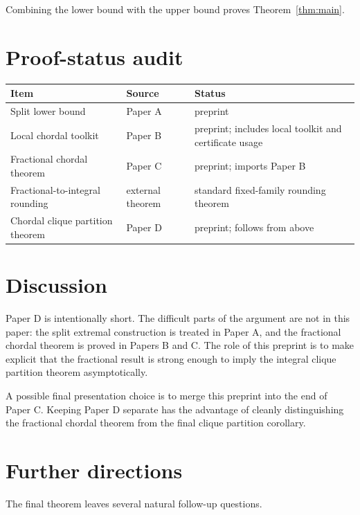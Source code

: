\documentclass[11pt]{article}
\theoremstyle{definition}
\begin{document}
Combining the lower bound with the upper bound proves Theorem~\ref{thm:main}.

\section{Proof-status audit}

\begin{center}
\begin{tabular}{lll}
\toprule
Item & Source & Status\\
\midrule
Split lower bound & Paper A & preprint\\
Local chordal toolkit & Paper B & preprint; includes local toolkit and certificate usage\\
Fractional chordal theorem & Paper C & preprint; imports Paper B\\
Fractional-to-integral rounding & external theorem & standard fixed-family rounding theorem\\
Chordal clique partition theorem & Paper D & preprint; follows from above\\
\bottomrule
\end{tabular}
\end{center}

\section{Discussion}

Paper D is intentionally short. The difficult parts of the argument are not in this paper: the split extremal construction is treated in Paper A, and the fractional chordal theorem is proved in Papers B and C. The role of this preprint is to make explicit that the fractional result is strong enough to imply the integral clique partition theorem asymptotically.

A possible final presentation choice is to merge this preprint into the end of Paper C. Keeping Paper D separate has the advantage of cleanly distinguishing the fractional chordal theorem from the final clique partition corollary.


\section{Further directions}

The final theorem leaves several natural follow-up questions.
\end{document}

